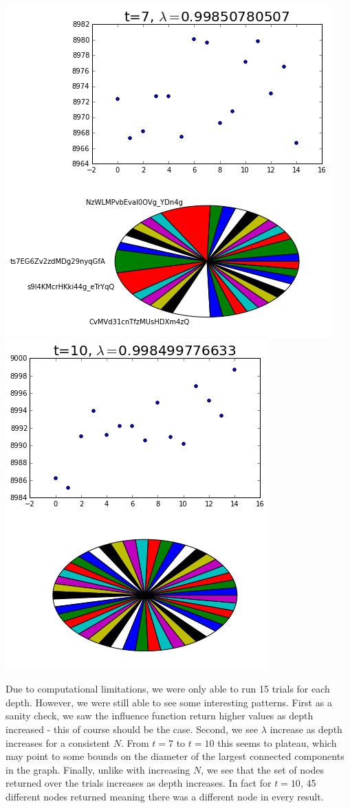 \documentclass{article}
\begin{document}
{		\includegraphics[scale=0.4]{full_7t}
		\hspace*{2cm}
		\includegraphics[scale=0.4]{full_10t}
		\par}	
		
		Due to computational limitations, we were only able to run 15 trials for each depth. However, we were still able to see some interesting patterns. First as a sanity check, we saw the influence function return higher values as depth increased - this of course should be the case. Second, we see $\lambda$ increase as depth increases for a consistent $N$. From $t=7$ to $t=10$ this seems to plateau, which may point to some bounds on the diameter of the largest connected components in the graph. Finally, unlike with increasing $N$, we see that the set of nodes returned over the trials increases as depth increases. In fact for $t=10$, 45 different nodes returned meaning there was a different node in every result.
\end{document}
